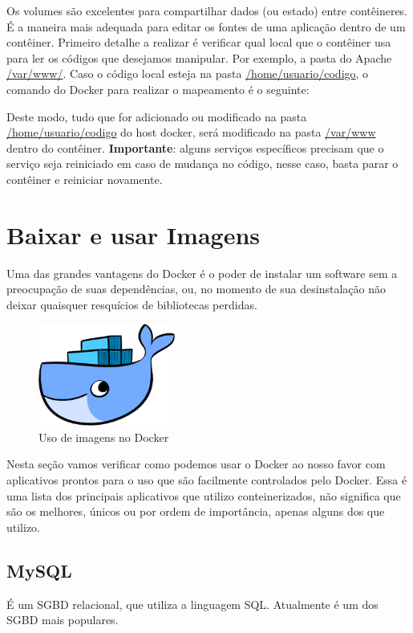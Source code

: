 \documentclass[a4paper,11pt]{article}
\begin{document}
Os volumes são excelentes para compartilhar dados (ou estado) entre contêineres. É a maneira mais adequada para editar os fontes de uma aplicação dentro de um contêiner. Primeiro detalhe a realizar é verificar qual local que o contêiner usa para ler os códigos que desejamos manipular. Por exemplo, a pasta do Apache \url{/var/www/}. Caso o código local esteja na pasta \url{/home/usuario/codigo}, o comando do Docker para realizar o mapeamento é o seguinte: \\

Deste modo, tudo que for adicionado ou modificado na pasta \url{/home/usuario/codigo} do host docker, será modificado na pasta \url{/var/www} dentro do contêiner. \textbf{Importante}: alguns serviços específicos precisam que o serviço seja reiniciado em caso de mudança no código, nesse caso, basta parar o contêiner e reiniciar novamente.

\section{Baixar e usar Imagens}
Uma das grandes vantagens do Docker é o poder de instalar um software sem a preocupação de suas dependências, ou, no momento de sua desinstalação não deixar quaisquer resquícios de bibliotecas perdidas.
\begin{figure}[H]
	\centering
	\includegraphics[width=0.4\textwidth]{imagem/whale-docker-logo.png}
	\caption{Uso de imagens no Docker}
\end{figure}

Nesta seção vamos verificar como podemos usar o Docker ao nosso favor com aplicativos prontos para o uso que são facilmente controlados pelo Docker. Essa é uma lista dos principais aplicativos que utilizo conteinerizados, não significa que são os melhores, únicos ou por ordem de importância, apenas alguns dos que utilizo.

\subsection{MySQL}
É um SGBD relacional, que utiliza a linguagem SQL. Atualmente é um dos SGBD mais populares. 
\end{document}
